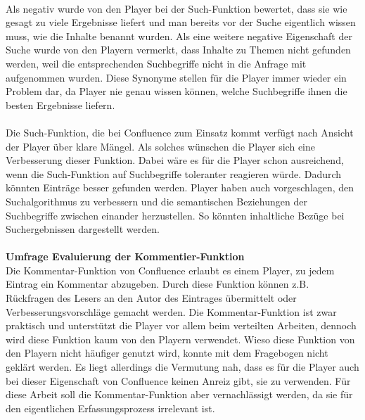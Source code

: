 \documentclass[a4paper,12pt,twoside]{scrartcl}
\begin{document}
\\
Als negativ wurde von den Player bei der Such-Funktion bewertet, dass sie wie gesagt zu viele Ergebnisse liefert und man bereits vor der Suche eigentlich wissen muss, wie die Inhalte benannt wurden. Als eine weitere negative Eigenschaft der Suche wurde von den Playern vermerkt, dass Inhalte zu Themen nicht gefunden werden, weil die entsprechenden Suchbegriffe nicht in die Anfrage mit aufgenommen wurden. Diese Synonyme stellen für die Player immer wieder ein Problem dar, da Player nie genau wissen können, welche Suchbegriffe ihnen die besten Ergebnisse liefern. 
\\\\
Die Such-Funktion, die bei Confluence zum Einsatz kommt verfügt nach Ansicht der Player über klare Mängel. Als solches wünschen die Player sich eine Verbesserung dieser Funktion. Dabei wäre es für die Player schon ausreichend, wenn die Such-Funktion auf Suchbegriffe toleranter reagieren würde. Dadurch könnten Einträge besser gefunden werden. Player haben auch vorgeschlagen, den Suchalgorithmus zu verbessern und die semantischen Beziehungen der Suchbegriffe zwischen einander herzustellen. So könnten inhaltliche Bezüge bei Suchergebnissen dargestellt werden.
\\\\
\textbf{Umfrage Evaluierung der Kommentier-Funktion}\\
Die Kommentar-Funktion von Confluence erlaubt es einem Player, zu jedem Eintrag ein Kommentar abzugeben. Durch diese Funktion können z.B. Rückfragen des Lesers an den Autor des Eintrages übermittelt oder Verbesserungsvorschläge gemacht werden. Die Kommentar-Funktion ist zwar praktisch und unterstützt die Player vor allem beim verteilten Arbeiten, dennoch wird diese Funktion kaum von den Playern verwendet. Wieso diese Funktion von den Playern nicht häufiger genutzt wird, konnte mit dem Fragebogen nicht geklärt werden. Es liegt allerdings die Vermutung nah, dass es für die Player auch bei dieser Eigenschaft von Confluence keinen Anreiz gibt, sie zu verwenden. Für diese Arbeit soll die Kommentar-Funktion aber vernachlässigt werden, da sie für den eigentlichen Erfassungsprozess irrelevant ist.
\end{document}

